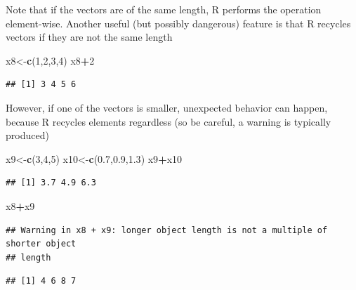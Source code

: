 \documentclass[
]{article}
\newenvironment{Shaded}{\begin{snugshade}}{\end{snugshade}}
\newcommand{\DecValTok}[1]{\textcolor[rgb]{0.00,0.00,0.81}{#1}}
\newcommand{\FloatTok}[1]{\textcolor[rgb]{0.00,0.00,0.81}{#1}}
\newcommand{\FunctionTok}[1]{\textcolor[rgb]{0.13,0.29,0.53}{\textbf{#1}}}
\newcommand{\NormalTok}[1]{#1}
\newcommand{\OtherTok}[1]{\textcolor[rgb]{0.56,0.35,0.01}{#1}}
\newcommand{\SpecialCharTok}[1]{\textcolor[rgb]{0.81,0.36,0.00}{\textbf{#1}}}
\begin{document}
Note that if the vectors are of the same length, R performs the
operation element-wise. Another useful (but possibly dangerous) feature
is that R recycles vectors if they are not the same length

\begin{Shaded}
\begin{Highlighting}[]
\NormalTok{x8}\OtherTok{\textless{}{-}}\FunctionTok{c}\NormalTok{(}\DecValTok{1}\NormalTok{,}\DecValTok{2}\NormalTok{,}\DecValTok{3}\NormalTok{,}\DecValTok{4}\NormalTok{)}
\NormalTok{x8}\SpecialCharTok{+}\DecValTok{2}
\end{Highlighting}
\end{Shaded}

\begin{verbatim}
## [1] 3 4 5 6
\end{verbatim}

However, if one of the vectors is smaller, unexpected behavior can
happen, because R recycles elements regardless (so be careful, a warning
is typically produced)

\begin{Shaded}
\begin{Highlighting}[]
\NormalTok{x9}\OtherTok{\textless{}{-}}\FunctionTok{c}\NormalTok{(}\DecValTok{3}\NormalTok{,}\DecValTok{4}\NormalTok{,}\DecValTok{5}\NormalTok{)}
\NormalTok{x10}\OtherTok{\textless{}{-}}\FunctionTok{c}\NormalTok{(}\FloatTok{0.7}\NormalTok{,}\FloatTok{0.9}\NormalTok{,}\FloatTok{1.3}\NormalTok{)}
\NormalTok{x9}\SpecialCharTok{+}\NormalTok{x10}
\end{Highlighting}
\end{Shaded}

\begin{verbatim}
## [1] 3.7 4.9 6.3
\end{verbatim}

\begin{Shaded}
\begin{Highlighting}[]
\NormalTok{x8}\SpecialCharTok{+}\NormalTok{x9}
\end{Highlighting}
\end{Shaded}

\begin{verbatim}
## Warning in x8 + x9: longer object length is not a multiple of shorter object
## length
\end{verbatim}

\begin{verbatim}
## [1] 4 6 8 7
\end{verbatim}
\end{document}
